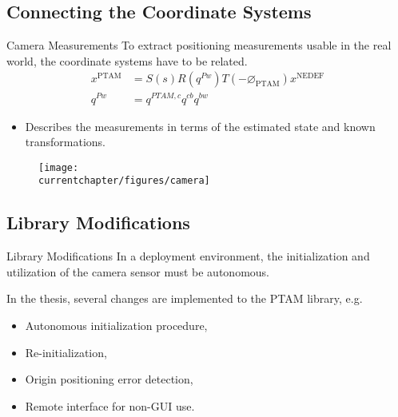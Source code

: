     \subsection{Connecting the Coordinate Systems}
    \begin{frame}{Camera Measurements}
        To extract positioning measurements usable in the real world,
        the coordinate systems have to be related.
        \begin{align*}
            x^{\text{PTAM}} &= S(s) R(q^{Pw}) T(-\varnothing_{\text{PTAM}}) x^{\text{NEDEF}} \\
            q^{Pw} &= q^{PTAM,c} q^{cb} q^{bw}
        \end{align*}
\vspace{-1cm}
        \begin{itemize}
            \item Describes the measurements in terms of the estimated state and known transformations.
        \end{itemize}
\vspace{-0.5cm}
        \begin{figure}[h]
        \centering
            \texttt{[image: \\currentchapter/figures/camera]}
        \end{figure}

    \end{frame}

    \subsection{Library Modifications}
    \begin{frame}{Library Modifications}
        In a deployment environment, the initialization and utilization of
        the camera sensor must be autonomous.

        In the thesis, several changes are implemented to the PTAM library, e.g.
        \begin{itemize}
            \item Autonomous initialization procedure,
            \item Re-initialization,
            \item Origin positioning error detection,
            \item Remote interface for non-GUI use.
        \end{itemize}
    \end{frame}
